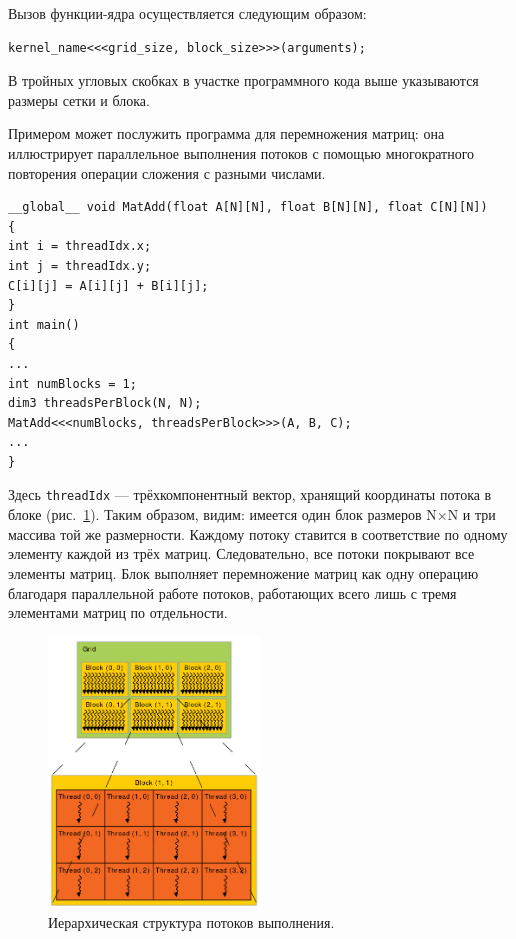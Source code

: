 Вызов функции-ядра осуществляется следующим образом:
\begin{verbatim}
kernel_name<<<grid_size, block_size>>>(arguments);
\end{verbatim}

В тройных угловых скобках в участке программного кода выше указываются размеры сетки и блока.

Примером может послужить программа для перемножения матриц: она
иллюстрирует параллельное выполнения потоков с помощью многократного
повторения операции сложения с разными числами.

\begin{verbatim}
__global__ void MatAdd(float A[N][N], float B[N][N], float C[N][N])
{
int i = threadIdx.x;
int j = threadIdx.y;
C[i][j] = A[i][j] + B[i][j];
}
int main()
{
...
int numBlocks = 1;
dim3 threadsPerBlock(N, N);
MatAdd<<<numBlocks, threadsPerBlock>>>(A, B, C);
...
}
\end{verbatim}

Здесь \texttt{threadIdx} --- трёхкомпонентный вектор, хранящий координаты потока в блоке (рис.~\ref{fig:ThreadsStructure}). Таким образом, видим: имеется один блок размеров N×N и три массива той же размерности. Каждому потоку ставится в соответствие по одному элементу каждой из трёх матриц. Следовательно, все потоки покрывают все элементы матриц. Блок выполняет перемножение матриц как одну операцию благодаря параллельной работе потоков, работающих всего лишь с тремя элементами матриц по отдельности.

\begin{figure}[p]
\centering
\includegraphics[width=0.5\textwidth]{include/graphics/image2}
\caption{Иерархическая структура потоков выполнения.}
\label{fig:ThreadsStructure}
\end{figure}

